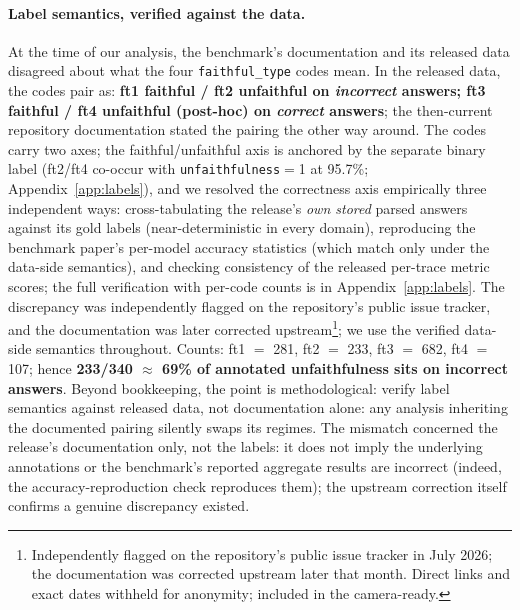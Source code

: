 \documentclass{article}
\begin{document}
\paragraph{Label semantics, verified against the data.}
\label{sec:labels}
At the time of our analysis, the benchmark's documentation and its released data disagreed about what the four \texttt{faithful\_type} codes mean. In the released data, the codes pair as: \textbf{ft1 faithful / ft2 unfaithful on \emph{incorrect} answers; ft3 faithful / ft4 unfaithful (post-hoc) on \emph{correct} answers}; the then-current repository documentation stated the pairing the other way around. The codes carry two axes; the faithful/unfaithful axis is anchored by the separate binary label (ft2/ft4 co-occur with \texttt{unfaithfulness}$=$1 at 95.7\%; Appendix~\ref{app:labels}), and we resolved the correctness axis empirically three independent ways: cross-tabulating the release's \emph{own stored} parsed answers against its gold labels (near-deterministic in every domain), reproducing the benchmark paper's per-model accuracy statistics (which match only under the data-side semantics), and checking consistency of the released per-trace metric scores; the full verification with per-code counts is in Appendix~\ref{app:labels}. The discrepancy was independently flagged on the repository's public issue tracker, and the documentation was later corrected upstream\footnote{Independently flagged on the repository's public issue tracker in July 2026; the documentation was corrected upstream later that month. Direct links and exact dates withheld for anonymity; included in the camera-ready.}; we use the verified data-side semantics throughout. Counts: ft1 $=$ 281, ft2 $=$ 233, ft3 $=$ 682, ft4 $=$ 107; hence \textbf{233/340 $\approx$ 69\% of annotated unfaithfulness sits on incorrect answers}. Beyond bookkeeping, the point is methodological: verify label semantics against released data, not documentation alone: any analysis inheriting the documented pairing silently swaps its regimes. The mismatch concerned the release's documentation only, not the labels: it does not imply the underlying annotations or the benchmark's reported aggregate results are incorrect (indeed, the accuracy-reproduction check reproduces them); the upstream correction itself confirms a genuine discrepancy existed.
\end{document}
